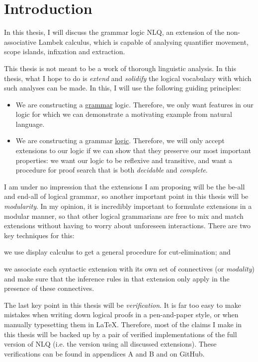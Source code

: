 \section{Introduction}
\label{sec:introduction}

In this thesis, I will discuss the grammar logic NLQ, an extension of
the non-associative Lambek calculus, which is capable of analysing
quantifier movement, scope islands, infixation and extraction.

This thesis is not meant to be a work of thorough linguistic
analysis. In this thesis, what I hope to do is \emph{extend} and
\emph{solidify} the logical vocabulary with which such analyses can be
made. In this, I will use the following guiding principles:
\begin{itemize}
\item We are constructing a \uline{grammar} logic. Therefore, we only
  want features in our logic for which we can demonstrate a motivating
  example from natural language.
\item We are constructing a grammar \uline{logic}. Therefore, we will
  only accept extensions to our logic if we can show that they
  preserve our most important properties: we want our logic to be
  reflexive and transitive, and want a procedure for proof
  search that is both \emph{decidable} and \emph{complete}.
\end{itemize}
I am under no impression that the extensions I am proposing will be
the be-all and end-all of logical grammar, so another important point
in this thesis will be \emph{modularity}.
In my opinion, it is incredibly important to formulate extensions in a
modular manner, so that other logical grammarians are free to mix and
match extensions without having to worry about unforeseen
interactions. There are two key techniques for this:
\begin{enumerate*}[label=(\arabic*)]
\item
  we use display calculus to get a general procedure for
  cut-elimination; and
\item
  we associate each syntactic extension with its own set of
  connectives (or \emph{modality}) and make sure that the inference
  rules in that extension only apply in the presence of these
  connectives.
\end{enumerate*}

The last key point in this thesis will be \emph{verification}. It is
far too easy to make mistakes when writing down logical proofs in a
pen-and-paper style, or when manually typesetting them in
\LaTeX. Therefore, most of the claims I make in this thesis will be
backed up by a pair of verified implementations of the full version
of NLQ (i.e. the version using all discussed extensions).
These verifications can be found in appendices A and B and on GitHub.

